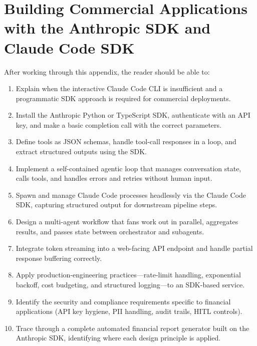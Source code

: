 \chapter{Building Commercial Applications with the Anthropic SDK and Claude Code SDK}
\label{app:sdk-commercial}

\begin{remark}
After working through this appendix, the reader should be able to:
\begin{enumerate}
  \item Explain when the interactive Claude Code CLI is insufficient and a
        programmatic SDK approach is required for commercial deployments.
  \item Install the Anthropic Python or TypeScript SDK, authenticate with an
        API key, and make a basic completion call with the correct parameters.
  \item Define tools as JSON schemas, handle tool-call responses in a loop,
        and extract structured outputs using the SDK.
  \item Implement a self-contained agentic loop that manages conversation
        state, calls tools, and handles errors and retries without human input.
  \item Spawn and manage Claude Code processes headlessly via the Claude Code
        SDK, capturing structured output for downstream pipeline steps.
  \item Design a multi-agent workflow that fans work out in parallel, aggregates
        results, and passes state between orchestrator and subagents.
  \item Integrate token streaming into a web-facing API endpoint and handle
        partial response buffering correctly.
  \item Apply production-engineering practices---rate-limit handling, exponential
        backoff, cost budgeting, and structured logging---to an SDK-based service.
  \item Identify the security and compliance requirements specific to financial
        applications (API key hygiene, PII handling, audit trails, HITL controls).
  \item Trace through a complete automated financial report generator built on
        the Anthropic SDK, identifying where each design principle is applied.
\end{enumerate}
\end{remark}

